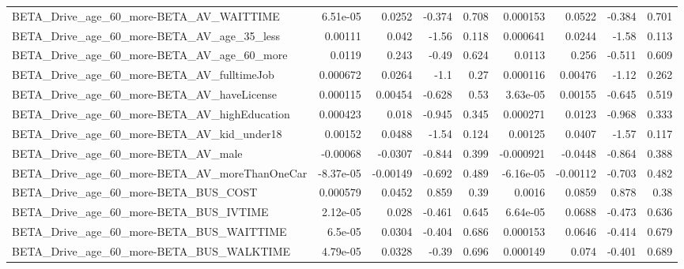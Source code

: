 \begin{tabular}{lrrrrrrrr}
BETA\_Drive\_age\_60\_more-BETA\_AV\_WAITTIME            &    6.51e-05 &       0.0252 &   -0.374 &    0.708 &   0.000153 &      0.0522 &       -0.384 &         0.701 \\
BETA\_Drive\_age\_60\_more-BETA\_AV\_age\_35\_less         &     0.00111 &        0.042 &    -1.56 &    0.118 &   0.000641 &      0.0244 &        -1.58 &         0.113 \\
BETA\_Drive\_age\_60\_more-BETA\_AV\_age\_60\_more         &      0.0119 &        0.243 &    -0.49 &    0.624 &     0.0113 &       0.256 &       -0.511 &         0.609 \\
BETA\_Drive\_age\_60\_more-BETA\_AV\_fulltimeJob         &    0.000672 &       0.0264 &     -1.1 &     0.27 &   0.000116 &     0.00476 &        -1.12 &         0.262 \\
BETA\_Drive\_age\_60\_more-BETA\_AV\_haveLicense         &    0.000115 &      0.00454 &   -0.628 &     0.53 &   3.63e-05 &     0.00155 &       -0.645 &         0.519 \\
BETA\_Drive\_age\_60\_more-BETA\_AV\_highEducation       &    0.000423 &        0.018 &   -0.945 &    0.345 &   0.000271 &      0.0123 &       -0.968 &         0.333 \\
BETA\_Drive\_age\_60\_more-BETA\_AV\_kid\_under18         &     0.00152 &       0.0488 &    -1.54 &    0.124 &    0.00125 &      0.0407 &        -1.57 &         0.117 \\
BETA\_Drive\_age\_60\_more-BETA\_AV\_male                &    -0.00068 &      -0.0307 &   -0.844 &    0.399 &  -0.000921 &     -0.0448 &       -0.864 &         0.388 \\
BETA\_Drive\_age\_60\_more-BETA\_AV\_moreThanOneCar      &   -8.37e-05 &     -0.00149 &   -0.692 &    0.489 &  -6.16e-05 &    -0.00112 &       -0.703 &         0.482 \\
BETA\_Drive\_age\_60\_more-BETA\_BUS\_COST               &    0.000579 &       0.0452 &    0.859 &     0.39 &     0.0016 &      0.0859 &        0.878 &          0.38 \\
BETA\_Drive\_age\_60\_more-BETA\_BUS\_IVTIME             &    2.12e-05 &        0.028 &   -0.461 &    0.645 &   6.64e-05 &      0.0688 &       -0.473 &         0.636 \\
BETA\_Drive\_age\_60\_more-BETA\_BUS\_WAITTIME           &     6.5e-05 &       0.0304 &   -0.404 &    0.686 &   0.000153 &      0.0646 &       -0.414 &         0.679 \\
BETA\_Drive\_age\_60\_more-BETA\_BUS\_WALKTIME           &    4.79e-05 &       0.0328 &    -0.39 &    0.696 &   0.000149 &       0.074 &       -0.401 &         0.689 \\

\end{tabular}
